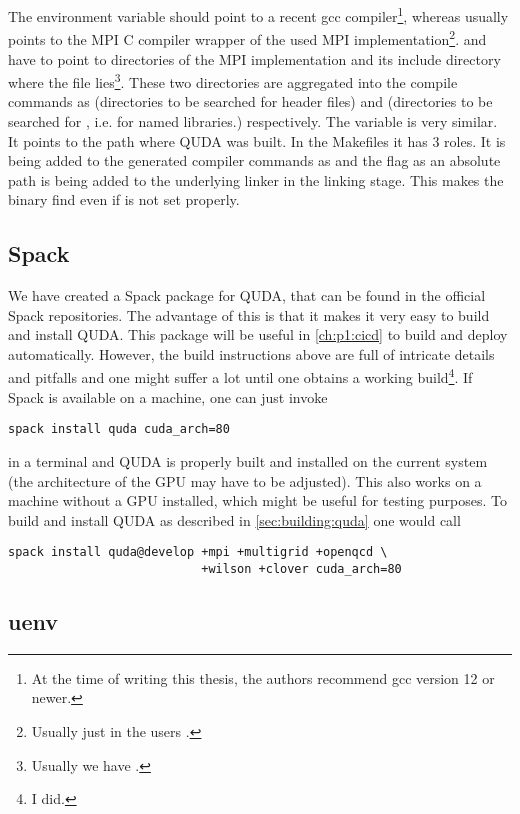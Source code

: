 The environment variable  should point to a recent gcc compiler\footnote{At the time of writing this thesis, the authors recommend gcc version 12 or newer.}, whereas  usually points to the MPI C compiler wrapper of the used MPI implementation\footnote{Usually just  in the users .}.  and  have to point to directories of the MPI implementation and its include directory where the file  lies\footnote{Usually we have .}. These two directories are aggregated into the compile commands as  (directories to be searched for header files) and  (directories to be searched for , i.e. for named libraries.) respectively. The variable  is very similar. It points to the path where QUDA was built. In the Makefiles it has 3 roles. It is being added to the generated compiler commands as  and the flag  as an absolute path is being added to the underlying linker in the linking stage. This makes the binary find  even if  is not set properly.



\subsection{Spack}
\label{sec:building:quda:spack}

We have created a Spack\cite{Gamblin_The_Spack_Package_2015} package for QUDA, that can be found in the official Spack repositories\cite{spack:quda}. The advantage of this is that it makes it very easy to build and install QUDA. This package will be useful in \cref{ch:p1:cicd} to build and deploy automatically. However, the build instructions above are full of intricate details and pitfalls and one might suffer a lot until one obtains a working build\footnote{I did.}. If Spack is available on a machine, one can just invoke
\begin{verbatim}
spack install quda cuda_arch=80
\end{verbatim}
in a terminal and QUDA is properly built and installed on the current system (the architecture  of the GPU may have to be adjusted). This also works on a machine without a GPU installed, which might be useful for testing purposes. To build and install QUDA as described in \cref{sec:building:quda} one would call
\begin{verbatim}
spack install quda@develop +mpi +multigrid +openqcd \
                           +wilson +clover cuda_arch=80
\end{verbatim}


\subsection{uenv}
\label{sec:building:uenv}

